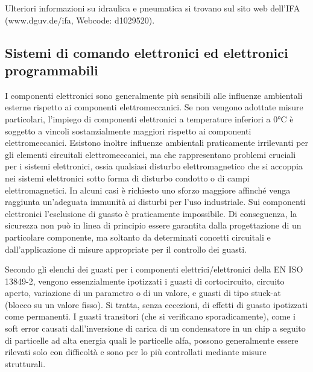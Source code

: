 Ulteriori informazioni su idraulica e pneumatica si trovano sul sito web dell'IFA (www.dguv.de/ifa, Webcode: d1029520).

\subsection{Sistemi di comando elettronici ed elettronici programmabili}
\label{sec:08-1-3}
I componenti elettronici sono generalmente più sensibili alle influenze ambientali esterne rispetto ai componenti elettromeccanici. Se non vengono adottate misure particolari, l'impiego di componenti elettronici a temperature inferiori a 0°C è soggetto a vincoli sostanzialmente maggiori rispetto ai componenti elettromeccanici. Esistono inoltre influenze ambientali praticamente irrilevanti per gli elementi circuitali elettromeccanici, ma che rappresentano problemi cruciali per i sistemi elettronici, ossia qualsiasi disturbo elettromagnetico che si accoppia nei sistemi elettronici sotto forma di disturbo condotto o di campi elettromagnetici. In alcuni casi è richiesto uno sforzo maggiore affinché venga raggiunta un'adeguata immunità ai disturbi per l'uso industriale. Sui componenti elettronici l'esclusione di guasto è praticamente impossibile. Di conseguenza, la sicurezza non può in linea di principio essere garantita dalla progettazione di un particolare componente, ma soltanto da determinati concetti circuitali e dall'applicazione di misure appropriate per il controllo dei guasti.

Secondo gli elenchi dei guasti per i componenti elettrici/elettronici della EN ISO 13849-2, vengono essenzialmente ipotizzati i guasti di cortocircuito, circuito aperto, variazione di un parametro o di un valore, e guasti di tipo stuck-at (blocco su un valore fisso). Si tratta, senza eccezioni, di effetti di guasto ipotizzati come permanenti. I guasti transitori (che si verificano sporadicamente), come i soft error causati dall'inversione di carica di un condensatore in un chip a seguito di particelle ad alta energia quali le particelle alfa, possono generalmente essere rilevati solo con difficoltà e sono per lo più controllati mediante misure strutturali.

